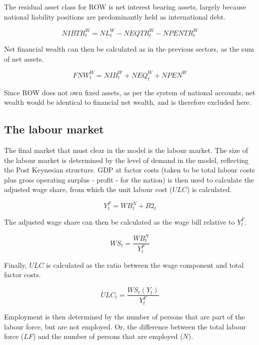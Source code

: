 \documentclass[
]{book}
\begin{document}
The residual asset class for ROW is net interest bearing assets,
largely because national liability positions are predominantly
held as international debt.

\begin{equation}
NIBTR^W_t = NL^W_t - NEQTR^W_t - NPENTR^W_t
\end{equation}

Net financial wealth can then be calculated as in the previous
sectors, as the sum of net assets.

\begin{equation}
FNW^W_t = NIB^W_t + NEQ^W_t + NPEN^W
\end{equation}

Since ROW does not own fixed assets, as per the system of
national accounts, net wealth would be identical to financial
net wealth, and is therefore excluded here.

\hypertarget{sec:fi-fl-sfc-model-eq-labour}{%
\subsection{The labour market}\label{sec:fi-fl-sfc-model-eq-labour}}

The final market that must clear in the model is the labour market.
The size of the labour market is determined by the level of demand in
the model, reflecting the Post Keynesian structure. GDP at factor costs
(taken to be total labour costs plus gross operating surplus - profit - for the nation) is
then used to calculate the adjusted wage share, from which the unit labour cost (\(ULC\))
is calculated.

\begin{equation}
Y^F_t = WB^N_t + B2_t
\end{equation}

The adjusted wage share can then be calculated as the wage bill relative to \(Y^F_t\).

\begin{equation}
WS_t = \frac{WB^N_t}{Y^F_t}
\end{equation}

Finally, \(ULC\) is calculated as the ratio between the wage component and total factor costs.

\begin{equation}
ULC_t = \frac{WS_t(Y_t)}{Y^F_t}
\end{equation}

Employment is then determined by the number of persons that are part of the labour force,
but are not employed. Or, the difference between the total labour force (\(LF\)) and the
number of persons that are employed (\(N\)).
\end{document}
